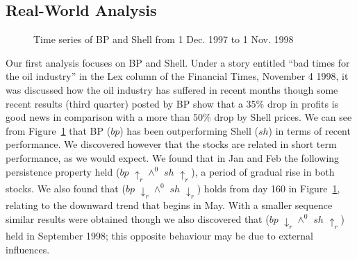 \subsection{Real-World Analysis}\label{sec:tr_real_analysis}


\begin{figure}
\centerline{}
\caption{\label{graph:bp_11mn_1}{Time series of BP and
Shell from 1 Dec. 1997 to 1 Nov. 1998}}
\end{figure}

Our first analysis
focuses on BP and Shell. Under a story entitled ``bad times for the
oil industry'' in the Lex column of the Financial Times, November 4
1998, it was discussed how the oil industry has suffered in recent
months though some recent results (third quarter) posted by BP show
that a 35\% drop in profits is good news in comparison with a more
than 50\% drop by Shell prices. We can see from
Figure~\ref{graph:bp_11mn_1} that BP ($bp$) has been outperforming
Shell ($sh$) in
terms of recent performance. We discovered however that the stocks are
related in short term performance, as we would expect. We found that
in Jan and Feb the following persistence property held \linebreak {}
($bp$ $\uparrow_r \wedge^0$ $sh$ $\uparrow_r$), a period of gradual
rise in both stocks. We also found that \linebreak {} ($bp$
$\downarrow_r \wedge^0$ $sh$ $\downarrow_r$) holds from day 160 in
Figure~\ref{graph:bp_11mn_1}, relating to the downward trend that
begins in May. With a smaller
sequence similar results 
were obtained though we also discovered that  ($bp$ $\downarrow_r
\wedge^0$ $sh$ $\uparrow_r$) held in September 1998; this opposite behaviour
may be due to external influences.

